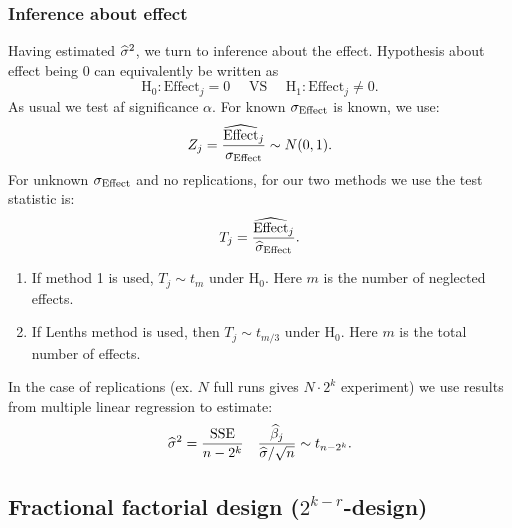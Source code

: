 \subsubsection{Inference about effect}
Having estimated $\widehat{\sigma}^2$, we turn to inference about the effect. Hypothesis about effect being $0$ can equivalently be written as
$$
    \mathrm{H}_0: \textrm{Effect}_j=0 \quad\textrm{ VS }\quad \mathrm{H}_1:\textrm{Effect}_j\ne 0.
$$
As usual we test af significance $\alpha$. For known $\sigma_\textrm{Effect}$ is known, we use:
$$
    Z_j = \frac{\widehat{\textrm{Effect}}_j}{\sigma_{\textrm{Effect}}} \sim N(0,1).
$$
For unknown $\sigma_\textrm{Effect}$ and no replications, for our two methods we use the test statistic is:
$$
    T_j = \frac{\widehat{\textrm{Effect}}_j}{\widehat{\sigma}_{\textrm{Effect}}}.
$$
\begin{enumerate}
    \item If method 1 is used, $T_j \sim t_m$ under $\mathrm{H}_0$. Here $m$ is the number of neglected effects. 
    \item If Lenths method is used, then $T_j \sim t_{m/3}$ under $\mathrm{H}_0$. Here $m$ is the total number of effects. 
\end{enumerate}

In the case of replications (ex. $N$ full runs gives $N\cdot 2^k$ experiment) we use results from multiple linear regression to estimate:
$$
    \widehat{\sigma}^2 = \frac{\textrm{SSE}}{n-2^k}
    \quad \frac{\widehat{\beta}_j}{\widehat{\sigma} / \sqrt{n}} \sim t_{n-2^k}.
$$


\subsection{Fractional factorial design ($2^{k-r}$-design)}

